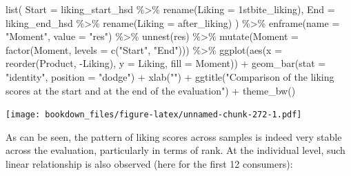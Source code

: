 \documentclass[
]{krantz}
\makeatletter
\newenvironment{Shaded}{\begin{snugshade}}{\end{snugshade}}
\newcommand{\AttributeTok}[1]{\textcolor[rgb]{0.61,0.61,0.61}{#1}}
\newcommand{\FunctionTok}[1]{\textcolor[rgb]{0,0,0}{#1}}
\newcommand{\NormalTok}[1]{#1}
\newcommand{\SpecialCharTok}[1]{\textcolor[rgb]{0,0,0}{#1}}
\newcommand{\StringTok}[1]{\textcolor[rgb]{0.5,0.5,0.5}{#1}}
\newenvironment{kframe}{%
\medskip{}
\setlength{\fboxsep}{.8em}
 \def\at@end@of@kframe{}%
 \ifinner\ifhmode%
  \def\at@end@of@kframe{\end{minipage}}%
  \begin{minipage}{\columnwidth}%
 \fi\fi%
 \def\FrameCommand##1{\hskip\@totalleftmargin \hskip-\fboxsep
 \colorbox{shadecolor}{##1}\hskip-\fboxsep
     \hskip-\linewidth \hskip-\@totalleftmargin \hskip\columnwidth}%
 \MakeFramed {\advance\hsize-\width
   \@totalleftmargin\z@ \linewidth\hsize
   \@setminipage}}%
 {\par\unskip\endMakeFramed%
 \at@end@of@kframe}
\renewenvironment{Shaded}{\begin{kframe}}{\end{kframe}}
\makeatother
\begin{document}
\begin{Shaded}
\begin{Highlighting}[]
\FunctionTok{list}\NormalTok{(}
  \AttributeTok{Start =}\NormalTok{ liking\_start\_hsd }\SpecialCharTok{\%\textgreater{}\%} \FunctionTok{rename}\NormalTok{(}\AttributeTok{Liking =} \StringTok{\textasciigrave{}}\AttributeTok{1stbite\_liking}\StringTok{\textasciigrave{}}\NormalTok{),}
  \AttributeTok{End =}\NormalTok{ liking\_end\_hsd }\SpecialCharTok{\%\textgreater{}\%} \FunctionTok{rename}\NormalTok{(}\AttributeTok{Liking =} \StringTok{\textasciigrave{}}\AttributeTok{after\_liking}\StringTok{\textasciigrave{}}\NormalTok{)}
\NormalTok{) }\SpecialCharTok{\%\textgreater{}\%}
  \FunctionTok{enframe}\NormalTok{(}\AttributeTok{name =} \StringTok{"Moment"}\NormalTok{, }\AttributeTok{value =} \StringTok{"res"}\NormalTok{) }\SpecialCharTok{\%\textgreater{}\%}
  \FunctionTok{unnest}\NormalTok{(res) }\SpecialCharTok{\%\textgreater{}\%}
  \FunctionTok{mutate}\NormalTok{(}\AttributeTok{Moment =} \FunctionTok{factor}\NormalTok{(Moment, }\AttributeTok{levels =} \FunctionTok{c}\NormalTok{(}\StringTok{"Start"}\NormalTok{, }\StringTok{"End"}\NormalTok{))) }\SpecialCharTok{\%\textgreater{}\%}
  \FunctionTok{ggplot}\NormalTok{(}\FunctionTok{aes}\NormalTok{(}\AttributeTok{x =} \FunctionTok{reorder}\NormalTok{(Product, }\SpecialCharTok{{-}}\NormalTok{Liking), }\AttributeTok{y =}\NormalTok{ Liking, }\AttributeTok{fill =}\NormalTok{ Moment)) }\SpecialCharTok{+}
  \FunctionTok{geom\_bar}\NormalTok{(}\AttributeTok{stat =} \StringTok{"identity"}\NormalTok{, }\AttributeTok{position =} \StringTok{"dodge"}\NormalTok{) }\SpecialCharTok{+}
  \FunctionTok{xlab}\NormalTok{(}\StringTok{""}\NormalTok{) }\SpecialCharTok{+}
  \FunctionTok{ggtitle}\NormalTok{(}\StringTok{"Comparison of the liking scores at the start and at the end of the evaluation"}\NormalTok{) }\SpecialCharTok{+}
  \FunctionTok{theme\_bw}\NormalTok{()}
\end{Highlighting}
\end{Shaded}

\texttt{[image: bookdown\_files/figure-latex/unnamed-chunk-272-1.pdf]}

As can be seen, the pattern of liking scores across samples is indeed very stable across the evaluation, particularly in terms of rank. At the individual level, such linear relationship is also observed (here for the first 12 consumers):
\end{document}
